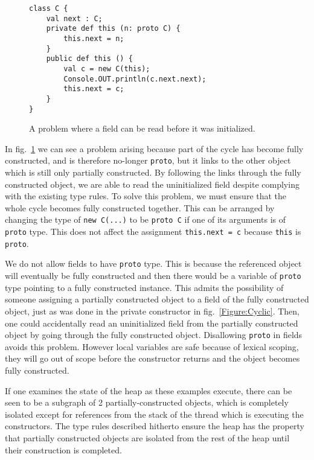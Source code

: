 \begin{figure}
\begin{lstlisting}
class C {
    val next : C;
    private def this (n: proto C) {
        this.next = n;
    }
    public def this () {
        val c = new C(this);
        Console.OUT.println(c.next.next);
        this.next = c;
    }
}
\end{lstlisting}
\caption{A problem where a field can be read before it was initialized.}
\label{Figure:Problem1}
\end{figure}

In fig.~\ref{Figure:Problem1} we can see a problem arising because part of the
cycle has become fully constructed, and is therefore no-longer \texttt{proto},
but it links to the other object which is still only partially constructed.  By
following the links through the fully constructed object, we are able to read
the uninitialized field despite complying with the existing type rules.  To
solve this problem, we must ensure that the whole cycle becomes fully
constructed together.  This can be arranged by changing the type of \texttt{new
C(...)} to be \texttt{proto C} if one of its arguments is of \texttt{proto}
type.  This does not affect the assignment \texttt{this.next = c} because
\texttt{this} is \texttt{proto}.

We do not allow fields to have \texttt{proto} type.  This is because the
referenced object will eventually be fully constructed and then there would be
a variable of \texttt{proto} type pointing to a fully constructed instance.
This admits the possibility of someone assigning a partially constructed object
to a field of the fully constructed object, just as was done in the private
constructor in fig.~\ref{Figure:Cyclic}.  Then, one could accidentally read an
uninitialized field from the partially constructed object by going through the
fully constructed object.  Disallowing \texttt{proto} in fields avoids this
problem.  However local variables are safe because of lexical scoping, they
will go out of scope before the constructor returns and the object becomes
fully constructed.

If one examines the state of the heap as these examples execute, there can be
seen to be a subgraph of 2 partially-constructed objects, which is completely
isolated except for references from the stack of the thread which is executing
the constructors.  The type rules described hitherto ensure the heap has the
property that partially constructed objects are isolated from the rest of the
heap until their construction is completed.

